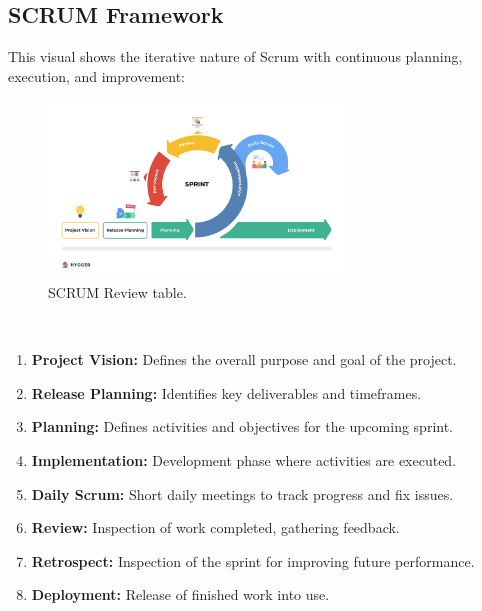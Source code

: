 \subsection{SCRUM Framework}
This visual shows the iterative nature of Scrum with continuous planning, execution, and improvement:
\begin{figure}[h]
    \centering
    \includegraphics[width=0.7\textwidth]{figures/Sprint-review-table-2-1.jpg} 
    \caption{SCRUM Review table.}
\end{figure} \ 
\begin{enumerate}
    \item \textbf{Project Vision:} Defines the overall purpose and goal of the project.
    \item \textbf{Release Planning:} Identifies key deliverables and timeframes.
    \item \textbf{Planning:} Defines activities and objectives for the upcoming sprint.
    \item \textbf{Implementation:} Development phase where activities are executed.
    \item \textbf{Daily Scrum:} Short daily meetings to track progress and fix issues.
    \item \textbf{Review:} Inspection of work completed, gathering feedback.
    \item \textbf{Retrospect:} Inspection of the sprint for improving future performance.
    \item \textbf{Deployment:} Release of finished work into use.
\end{enumerate}
